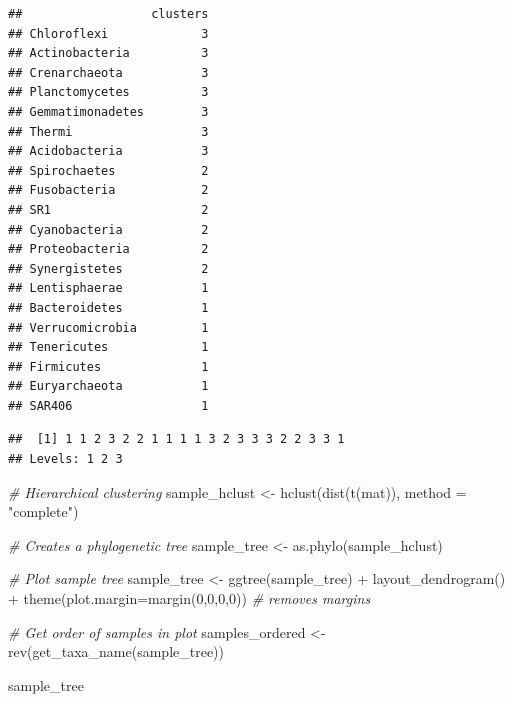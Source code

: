 \documentclass[
]{book}
\newenvironment{Shaded}{\begin{snugshade}}{\end{snugshade}}
\newcommand{\AttributeTok}[1]{\textcolor[rgb]{0.77,0.63,0.00}{#1}}
\newcommand{\CommentTok}[1]{\textcolor[rgb]{0.56,0.35,0.01}{\textit{#1}}}
\newcommand{\DecValTok}[1]{\textcolor[rgb]{0.00,0.00,0.81}{#1}}
\newcommand{\FunctionTok}[1]{\textcolor[rgb]{0.00,0.00,0.00}{#1}}
\newcommand{\NormalTok}[1]{#1}
\newcommand{\OtherTok}[1]{\textcolor[rgb]{0.56,0.35,0.01}{#1}}
\newcommand{\SpecialCharTok}[1]{\textcolor[rgb]{0.00,0.00,0.00}{#1}}
\newcommand{\StringTok}[1]{\textcolor[rgb]{0.31,0.60,0.02}{#1}}
\begin{document}
\begin{verbatim}
##                  clusters
## Chloroflexi             3
## Actinobacteria          3
## Crenarchaeota           3
## Planctomycetes          3
## Gemmatimonadetes        3
## Thermi                  3
## Acidobacteria           3
## Spirochaetes            2
## Fusobacteria            2
## SR1                     2
## Cyanobacteria           2
## Proteobacteria          2
## Synergistetes           2
## Lentisphaerae           1
## Bacteroidetes           1
## Verrucomicrobia         1
## Tenericutes             1
## Firmicutes              1
## Euryarchaeota           1
## SAR406                  1
\end{verbatim}

\begin{Shaded}
\end{Shaded}

\begin{verbatim}
##  [1] 1 1 2 3 2 2 1 1 1 1 3 2 3 3 3 2 2 3 3 1
## Levels: 1 2 3
\end{verbatim}

\begin{Shaded}
\begin{Highlighting}[]
\CommentTok{\# Hierarchical clustering}
\NormalTok{sample\_hclust }\OtherTok{\textless{}{-}} \FunctionTok{hclust}\NormalTok{(}\FunctionTok{dist}\NormalTok{(}\FunctionTok{t}\NormalTok{(mat)), }\AttributeTok{method =} \StringTok{"complete"}\NormalTok{)}

\CommentTok{\# Creates a phylogenetic tree}
\NormalTok{sample\_tree }\OtherTok{\textless{}{-}} \FunctionTok{as.phylo}\NormalTok{(sample\_hclust)}

\CommentTok{\# Plot sample tree}
\NormalTok{sample\_tree }\OtherTok{\textless{}{-}} \FunctionTok{ggtree}\NormalTok{(sample\_tree) }\SpecialCharTok{+} \FunctionTok{layout\_dendrogram}\NormalTok{() }\SpecialCharTok{+} 
  \FunctionTok{theme}\NormalTok{(}\AttributeTok{plot.margin=}\FunctionTok{margin}\NormalTok{(}\DecValTok{0}\NormalTok{,}\DecValTok{0}\NormalTok{,}\DecValTok{0}\NormalTok{,}\DecValTok{0}\NormalTok{)) }\CommentTok{\# removes margins}

\CommentTok{\# Get order of samples in plot}
\NormalTok{samples\_ordered }\OtherTok{\textless{}{-}} \FunctionTok{rev}\NormalTok{(}\FunctionTok{get\_taxa\_name}\NormalTok{(sample\_tree))}

\NormalTok{sample\_tree}
\end{Highlighting}
\end{Shaded}
\end{document}
